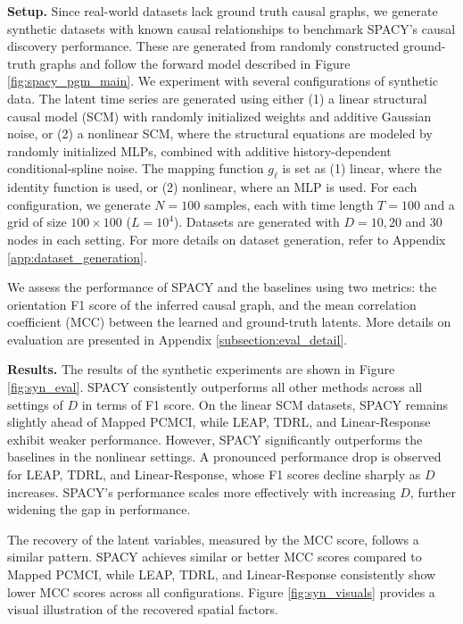 \textbf{Setup. } Since real-world datasets lack ground truth causal graphs, we generate synthetic datasets with known causal relationships to benchmark SPACY's causal discovery performance. These are generated from randomly constructed ground-truth graphs and follow the forward model described in Figure \ref{fig:spacy_pgm_main}. We experiment with several configurations of synthetic data. The latent time series are generated using either (1) a linear structural causal model (SCM) with randomly initialized weights and additive Gaussian noise, or (2) a nonlinear SCM, where the structural equations are modeled by randomly initialized MLPs, combined with additive history-dependent conditional-spline noise. The mapping function $g_\ell$ is set as (1) linear, where the identity function is used, or (2) nonlinear, where an MLP is used.  For each configuration, we generate $N=100$ samples, each with time length $T=100$ and a grid of size $100 \times 100$ ($L=10^4$). Datasets are generated with $D=10, 20$ and $30$ nodes in each setting. For more details on dataset generation, refer to Appendix \ref{app:dataset_generation}. 

We assess the performance of SPACY and the baselines using two metrics: the orientation F1 score of the inferred causal graph, and the mean correlation coefficient (MCC) between the learned and ground-truth latents. More details on evaluation are presented in Appendix \ref{subsection:eval_detail}.


\textbf{Results.} The results of the synthetic experiments are shown in Figure \ref{fig:syn_eval}. SPACY consistently outperforms all other methods across all settings of $D$ in terms of F1 score. On the linear SCM datasets, SPACY remains slightly ahead of  Mapped PCMCI, while LEAP, TDRL, and Linear-Response exhibit weaker performance. However, SPACY significantly outperforms the baselines in the nonlinear settings. A pronounced performance drop is observed for LEAP, TDRL, and Linear-Response, whose F1 scores decline sharply as $D$ increases. SPACY's performance scales more effectively with increasing $D$, further widening the gap in performance.

The recovery of the latent variables, measured by the MCC score, follows a similar pattern. SPACY achieves similar or better MCC scores compared to  Mapped PCMCI, while LEAP, TDRL, and Linear-Response consistently show lower MCC scores across all configurations. Figure \ref{fig:syn_visuals} provides a visual illustration of the recovered spatial factors.

